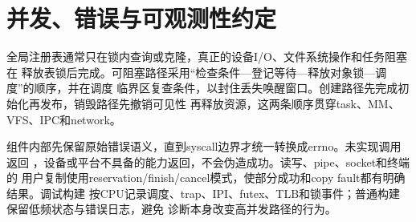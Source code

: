 \section{并发、错误与可观测性约定}

全局注册表通常只在锁内查询或克隆，真正的设备I/O、文件系统操作和任务阻塞在
释放表锁后完成。可阻塞路径采用“检查条件—登记等待—释放对象锁—调度”的顺序，并在调度
临界区复查条件，以封住丢失唤醒窗口。创建路径先完成初始化再发布，销毁路径先撤销可见性
再释放资源，这两条顺序贯穿task、MM、VFS、IPC和network。

组件内部先保留原始错误语义，直到syscall边界才统一转换成errno。未实现调用返回
，设备或平台不具备的能力返回，不会伪造成功。读写、pipe、socket和终端的
用户复制使用reservation/finish/cancel模式，使部分成功和copy fault都有明确结果。调试构建
按CPU记录调度、trap、IPI、futex、TLB和锁事件；普通构建保留低频状态与错误日志，避免
诊断本身改变高并发路径的行为。
